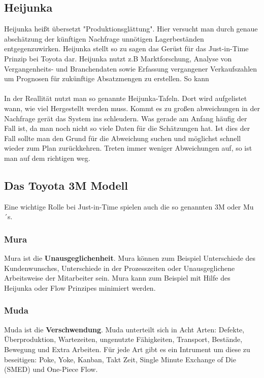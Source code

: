 \documentclass[00_ToyotaProduktionssystem.tex]{subfiles}
\begin{document}
\subsection{Heijunka}
Heijunka heißt übersetzt "Produktionsglättung". Hier versucht man durch genaue abschätzung der künftigen Nachfrage unnötigen Lagerbeständen entgegenzuwirken. Heijunka stellt so zu sagen das Gerüst für das Just-in-Time Prinzip bei Toyota dar. Heijunka nutzt z.B Marktforschung, Analyse von Vergangenheits- und Branchendaten sowie Erfassung vergangener Verkaufszahlen um Prognosen für zukünftige Absatzmengen zu erstellen. So kann 
\\
\\
In der Reallität nutzt man so genannte Heijunka-Tafeln. Dort wird aufgelistet wann, wie viel Hergestellt werden muss. Kommt es zu großen abweichungen in der Nachfrage gerät das System ins schleudern. Was gerade am Anfang häufig der Fall ist, da man noch nicht so viele Daten für die Schätzungen hat. 
Ist dies der Fall sollte man den Grund für die Abweichung suchen und möglichst schnell wieder zum Plan zurückkehren. Treten immer weniger Abweichungen auf, so ist man auf dem richtigen weg.

\subsection{Das Toyota 3M Modell}
Eine wichtige Rolle bei Just-in-Time spielen auch die so genannten 3M oder Mu´s.
\subsubsection{Mura}
Mura ist die \textbf{Unausgeglichenheit}. Mura können zum Beispiel Unterschiede des Kundenwunsches, Unterschiede in der Prozesszeiten oder Unausgeglichene Arbeitsweise der Mitarbeiter sein. Mura kann zum Beispiel mit Hilfe des Heijunka oder Flow Prinzipes minimiert werden.
\subsubsection{Muda}
Muda ist die \textbf{Verschwendung}. Muda unterteilt sich in Acht Arten: Defekte, Überproduktion, Wartezeiten, ungenutzte Fähigkeiten, Transport, Bestände, Bewegung und Extra Arbeiten. Für jede Art gibt es ein Intrument um diese zu beseitigen: Poke, Yoke, Kanban, Takt Zeit, Single Minute Exchange of Die (SMED) und One-Piece Flow.
\end{document}
